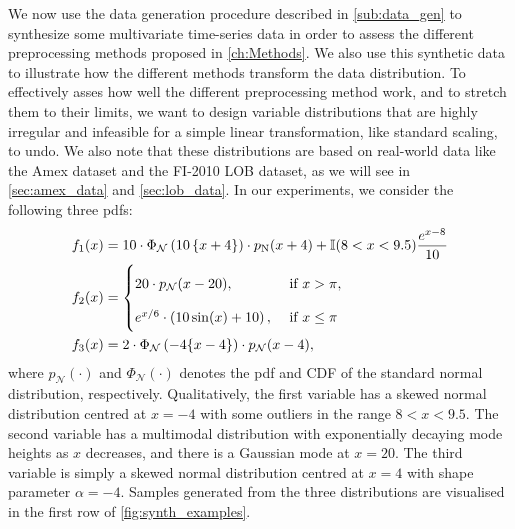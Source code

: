 \documentclass{statsmsc}
\begin{document}
{We now use the data generation procedure described in \cref{sub:data_gen} to synthesize some
multivariate time-series data in order to assess the different preprocessing methods proposed
in \cref{ch:Methods}. We also use this synthetic data to illustrate how the different methods
transform the data distribution.
To effectively asses how well the different preprocessing method work, and
to stretch them to their limits, we want to design variable distributions that are
highly irregular and infeasible for a simple linear transformation, like
standard scaling, to undo. We also note that these distributions are based on real-world
data like the Amex dataset and the FI-2010 LOB dataset, as we will see in
\cref{sec:amex_data} and \cref{sec:lob_data}.
In our experiments, we consider the following three \acp{pdf}:
\begin{align}
    f_1(x)&= 10 \cdot\Phi_{\mathcal{N}}\left(10\left\{x+4\right\}\right)\cdot p_{\textrm{N}}(x+4)
    +  \mathbb{I}(8 < x < 9.5) \frac{e^{x-8}}{10} \label{eq:synth_pdf1}\\
    f_2(x)&= \left\{
        \renewcommand\arraystretch{2}
        \begin{matrix*}[l]
            20 \cdot p_{\mathcal{N}}(x-20), & \textrm{ if } x > \pi, \\
            e^{x/6}\cdot\left(10\sin(x)+10 \right), & \textrm{ if } x \leq \pi
        \end{matrix*}
    \right. \label{eq:synth_pdf2}\\
        f_3(x)&=
        2 \cdot \Phi_{\mathcal{N}}\left(-4 \{ x-4\}\right) \cdot p_{\mathcal{N}}(x-4), \label{eq:synth_pdf3}
\end{align}
where $p_{\mathcal{N}}(\cdot)$ and $\Phi_{\mathcal{N}}(\cdot)$ denotes the \ac{pdf}
and \ac{CDF} of the standard normal distribution, respectively.
Qualitatively, the first variable has a skewed normal distribution centred at $x=-4$ with some
outliers in the range $8 < x < 9.5$. The second variable has a multimodal distribution with
exponentially decaying mode heights as $x$ decreases, and there is a Gaussian mode
at $x=20$. The third variable is simply a skewed normal distribution centred at
$x=4$ with shape parameter $\alpha=-4$. Samples generated from the three distributions are
visualised in the first row of \cref{fig:synth_examples}.

}
\end{document}
